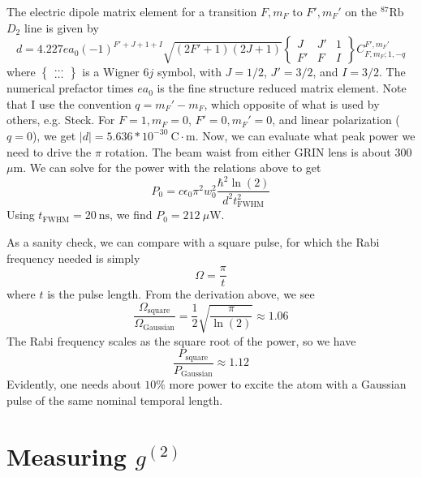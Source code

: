 The electric dipole matrix element for a transition $F,m_F$ to $F',m_F'$ on the $^{87}\textrm {Rb}$  $D_2$ line is given by
\begin{equation}d=4.227 e a_0 (-1)^{F'+J+1+I} \sqrt{(2 F'+1)(2 J+1)}\left\{\begin{array}{ccc}
J & J' & 1 \\
F' & F & I
\end{array}\right\}C_{F,m_F;1,-q}^{F',m_F'}
\end{equation}
where $\left\{ \begin{array}{c} \dots \\ \dots \end{array} \right\}$ is a Wigner $6j$ symbol, with $J=1/2$, $J'=3/2$, and $I=3/2$. The numerical prefactor times $e a_0$ is the fine structure reduced matrix element. Note that I use the convention $q = m_F' - m_F$, which opposite of what is used by others, e.g. Steck.
For $F=1, m_F=0$,  $F'=0, m_F'=0$, and linear polarization ($q=0$), we get
$|d|=5.636*10^{-30} ~\textrm{C}\cdot\textrm{m}$.
Now, we can evaluate what peak power we need to drive the $\pi$ rotation. The beam waist from either GRIN lens is about 300 $\mu \textrm{m}$. We can solve for the power with the relations above to get
\begin{equation}
    P_0 = c \epsilon_0 \pi^2 w_0^2 \frac{\hbar^2 \ln(2)}{d^2 t_{\textrm{FWHM}}^2}
\end{equation}
Using $t_{\textrm{FWHM}}=20~ \textrm{ns}$, we find $P_0 = 212~\mu \textrm{W}$.

As a sanity check, we can compare with a square pulse, for which the Rabi frequency needed is simply
\begin{equation}
    \Omega = \frac{\pi}{t}
\end{equation}
where $t$ is the pulse length. From the derivation above, we see \begin{equation}
    \frac{\Omega_{\textrm{square}}}{\Omega_{\textrm{Gaussian}}}=\frac{1}{2}\sqrt{\frac{\pi}{\ln(2)}} \approx 1.06
\end{equation}
The Rabi frequency scales as the square root of the power, so we have
\begin{equation}
\frac{P_{\textrm{square}}}{P_{\textrm{Gaussian}}} \approx 1.12
\end{equation}
Evidently, one needs about $10\%$ more power to excite the atom with a Gaussian pulse of the same nominal temporal length.

\section{Measuring $g^{(2)}$}

